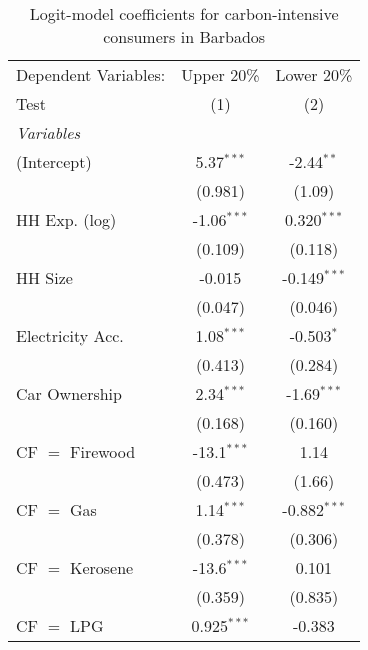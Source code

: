 
\begin{table}[htbp!]
   \centering
   \small
   \begin{adjustbox}{width = 1\textwidth, max height = 0.95\textheight, center}
      \begin{threeparttable}[b]
         \caption{\label{tab:Logit_1_BRB} Logit-model coefficients for carbon-intensive consumers in Barbados}
         \begin{tabular}{lcc}
            \tabularnewline \midrule \midrule
            Dependent Variables:  & Upper 20\%    & Lower 20\%\\   
            Test                  & (1)           & (2)\\  
            \midrule
            \emph{Variables}\\
            (Intercept)           & 5.37$^{***}$  & -2.44$^{**}$\\   
                                  & (0.981)       & (1.09)\\   
            HH Exp. (log)         & -1.06$^{***}$ & 0.320$^{***}$\\   
                                  & (0.109)       & (0.118)\\   
            HH Size               & -0.015        & -0.149$^{***}$\\   
                                  & (0.047)       & (0.046)\\   
            Electricity Acc.      & 1.08$^{***}$  & -0.503$^{*}$\\   
                                  & (0.413)       & (0.284)\\   
            Car Ownership         & 2.34$^{***}$  & -1.69$^{***}$\\   
                                  & (0.168)       & (0.160)\\   
            CF $=$ Firewood       & -13.1$^{***}$ & 1.14\\   
                                  & (0.473)       & (1.66)\\   
            CF $=$ Gas            & 1.14$^{***}$  & -0.882$^{***}$\\   
                                  & (0.378)       & (0.306)\\   
            CF $=$ Kerosene       & -13.6$^{***}$ & 0.101\\   
                                  & (0.359)       & (0.835)\\   
            CF $=$ LPG            & 0.925$^{***}$ & -0.383\\   

\end{tabular}
\end{threeparttable}
\end{adjustbox}
\end{table}
